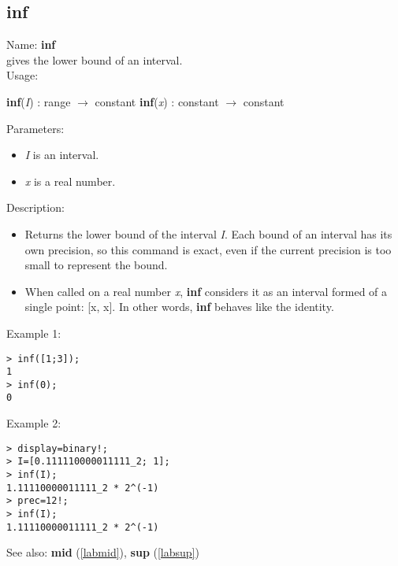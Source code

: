 \subsection{inf}
\label{labinf}
\noindent Name: \textbf{inf}\\
gives the lower bound of an interval.\\
\noindent Usage: 
\begin{center}
\textbf{inf}(\emph{I}) : \textsf{range} $\rightarrow$ \textsf{constant}
\textbf{inf}(\emph{x}) : \textsf{constant} $\rightarrow$ \textsf{constant}
\end{center}
Parameters: 
\begin{itemize}
\item \emph{I} is an interval.
\item \emph{x} is a real number.
\end{itemize}
\noindent Description: \begin{itemize}

\item Returns the lower bound of the interval \emph{I}. Each bound of an interval has its 
   own precision, so this command is exact, even if the current precision is too 
   small to represent the bound.

\item When called on a real number \emph{x}, \textbf{inf} considers it as an interval formed
   of a single point: [x, x]. In other words, \textbf{inf} behaves like the identity.
\end{itemize}
\noindent Example 1: 
\begin{center}\begin{minipage}{15cm}\begin{Verbatim}[frame=single]
> inf([1;3]);
1
> inf(0);
0
\end{Verbatim}
\end{minipage}\end{center}
\noindent Example 2: 
\begin{center}\begin{minipage}{15cm}\begin{Verbatim}[frame=single]
> display=binary!;
> I=[0.111110000011111_2; 1];
> inf(I);
1.11110000011111_2 * 2^(-1)
> prec=12!;
> inf(I);
1.11110000011111_2 * 2^(-1)
\end{Verbatim}
\end{minipage}\end{center}
See also: \textbf{mid} (\ref{labmid}), \textbf{sup} (\ref{labsup})
